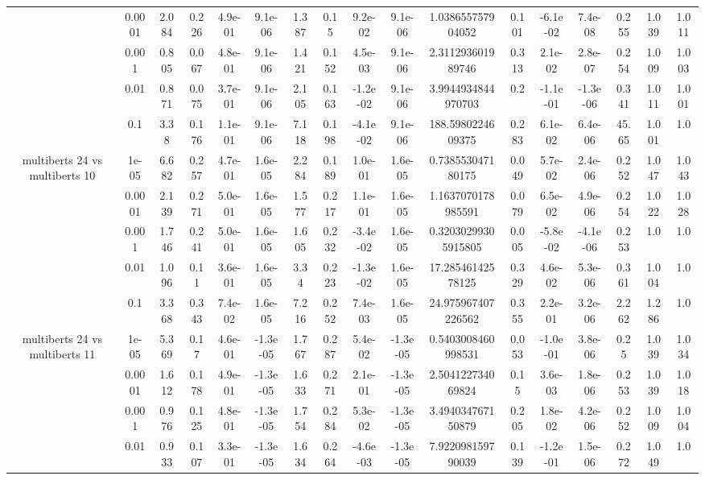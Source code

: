 \begin{tabular}{|c|c|c|c|c|c|c|c|c|c|c|c|c|c|c|c|c|}
 & 0.0001 & 2.084 & 0.226 & 4.9e-01 & 9.1e-06 & 1.387 & 0.15 & 9.2e-02 & 9.1e-06 & 1.038655757904052 & 0.101 & -6.1e-02 & 7.4e-08 & 0.255 & 1.039 & 1.011 \\
 & 0.001 & 0.805 & 0.067 & 4.8e-01 & 9.1e-06 & 1.421 & 0.152 & 4.5e-03 & 9.1e-06 & 2.311293601989746 & 0.313 & 2.1e-02 & 2.8e-07 & 0.254 & 1.009 & 1.003 \\
 & 0.01 & 0.871 & 0.075 & 3.7e-01 & 9.1e-06 & 2.105 & 0.163 & -1.2e-02 & 9.1e-06 & 3.9944934844970703 & 0.2 & -1.1e-01 & -1.3e-06 & 0.341 & 1.011 & 1.001 \\
 & 0.1 & 3.38 & 0.176 & 1.1e-01 & 9.1e-06 & 7.118 & 0.198 & -4.1e-02 & 9.1e-06 & 188.5980224609375 & 0.283 & 6.1e-02 & 6.4e-06 & 45.65 & 1.001 & 1.0 \\
\hline
\multirow{5}{*}{multiberts 24 vs multiberts 10} & 1e-05 & 6.682 & 0.257 & 4.7e-01 & 1.6e-05 & 2.284 & 0.189 & 1.0e-01 & 1.6e-05 & 0.738553047180175 & 0.049 & 5.7e-02 & 2.4e-06 & 0.252 & 1.047 & 1.043 \\
 & 0.0001 & 2.139 & 0.271 & 5.0e-01 & 1.6e-05 & 1.577 & 0.217 & 1.1e-01 & 1.6e-05 & 1.1637070178985591 & 0.079 & 6.5e-02 & 4.9e-06 & 0.254 & 1.022 & 1.028 \\
 & 0.001 & 1.746 & 0.241 & 5.0e-01 & 1.6e-05 & 1.605 & 0.232 & -3.4e-02 & 1.6e-05 & 0.32030299305915805 & 0.005 & -5.8e-02 & -4.1e-06 & 0.253 & 1.0 & 1.0 \\
 & 0.01 & 1.096 & 0.11 & 3.6e-01 & 1.6e-05 & 3.34 & 0.223 & -1.3e-02 & 1.6e-05 & 17.28546142578125 & 0.329 & 4.6e-02 & 5.3e-06 & 0.361 & 1.004 & 1.0 \\
 & 0.1 & 3.368 & 0.343 & 7.4e-02 & 1.6e-05 & 7.216 & 0.252 & 7.4e-03 & 1.6e-05 & 24.975967407226562 & 0.355 & 2.2e-01 & 3.2e-06 & 2.262 & 1.286 & 1.0 \\
\hline
\multirow{5}{*}{multiberts 24 vs multiberts 11} & 1e-05 & 5.369 & 0.17 & 4.6e-01 & -1.3e-05 & 1.767 & 0.287 & 5.4e-02 & -1.3e-05 & 0.5403008460998531 & 0.053 & -1.0e-01 & 3.8e-06 & 0.25 & 1.039 & 1.034 \\
 & 0.0001 & 1.612 & 0.178 & 4.9e-01 & -1.3e-05 & 1.633 & 0.271 & 2.1e-01 & -1.3e-05 & 2.504122734069824 & 0.15 & 3.6e-03 & 1.8e-06 & 0.253 & 1.039 & 1.018 \\
 & 0.001 & 0.976 & 0.125 & 4.8e-01 & -1.3e-05 & 1.754 & 0.284 & 5.3e-02 & -1.3e-05 & 3.494034767150879 & 0.205 & 1.8e-02 & 4.2e-06 & 0.252 & 1.009 & 1.004 \\
 & 0.01 & 0.933 & 0.107 & 3.3e-01 & -1.3e-05 & 1.634 & 0.264 & -4.6e-03 & -1.3e-05 & 7.922098159790039 & 0.139 & -1.2e-01 & 1.5e-06 & 0.272 & 1.049 & 1.0 \\

\end{tabular}
